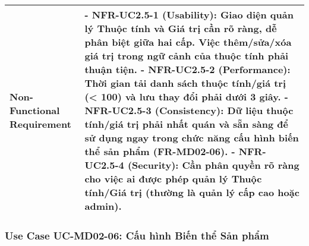\begin{longtable}{|m{4cm}|p{11cm}|}
\hline
Non-Functional Requirement & - \textbf{NFR-UC2.5-1 (Usability):} Giao diện quản lý Thuộc tính và Giá trị cần rõ ràng, dễ phân biệt giữa hai cấp. Việc thêm/sửa/xóa giá trị trong ngữ cảnh của thuộc tính phải thuận tiện. \newline - \textbf{NFR-UC2.5-2 (Performance):} Thời gian tải danh sách thuộc tính/giá trị (< 100) và lưu thay đổi phải dưới 3 giây. \newline - \textbf{NFR-UC2.5-3 (Consistency):} Dữ liệu thuộc tính/giá trị phải nhất quán và sẵn sàng để sử dụng ngay trong chức năng cấu hình biến thể sản phẩm (FR-MD02-06). \newline - \textbf{NFR-UC2.5-4 (Security):} Cần phân quyền rõ ràng cho việc ai được phép quản lý Thuộc tính/Giá trị (thường là quản lý cấp cao hoặc admin). \\
\hline

\end{longtable}


\subsubsection{Use Case UC-MD02-06: Cấu hình Biến thể Sản phẩm}

